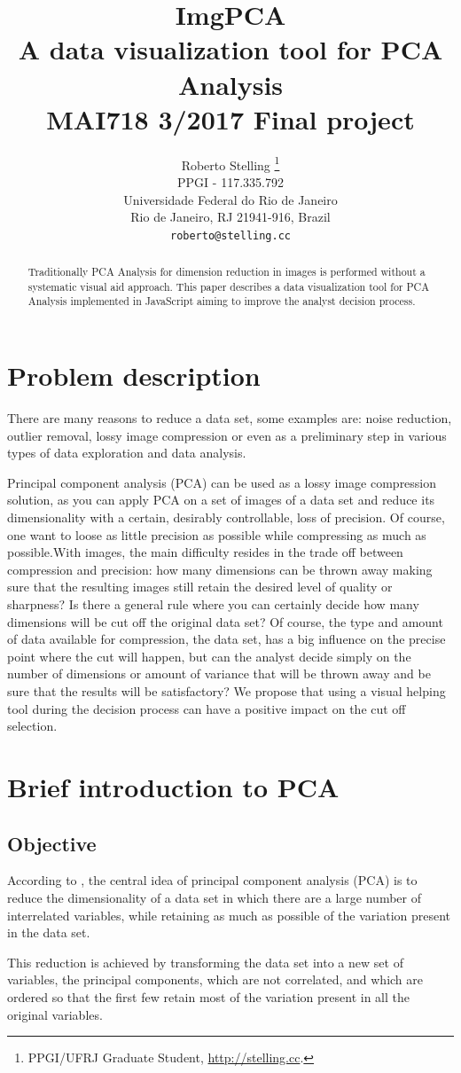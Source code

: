 \documentclass{article} %
\title{ImgPCA \\ A data visualization tool for PCA Analysis \\ MAI718 3/2017 Final project}
\author{Roberto Stelling \thanks{ PPGI/UFRJ Graduate Student, \href{http://stelling.cc}{http://stelling.cc}.} \\
PPGI - 117.335.792\\
Universidade Federal do Rio de Janeiro\\
Rio de Janeiro, RJ 21941-916, Brazil \\
\texttt{roberto@stelling.cc}
}
\begin{document}
\maketitle
\pagestyle{plain}

\begin{abstract}
Traditionally PCA Analysis for dimension reduction in images is performed without a systematic visual aid approach. This paper describes a data visualization tool for PCA Analysis implemented in JavaScript aiming to improve the analyst decision process.
\end{abstract}

\section{Problem description}
There are many reasons to reduce a data set, some examples are: noise reduction, outlier removal, lossy image compression or even as a preliminary step in various types of data exploration and data analysis.\par
Principal component analysis (PCA) can be used as a lossy image compression solution, as you can apply PCA on a set of images of a data set and reduce its dimensionality with a certain, desirably controllable, loss of precision. Of course, one want to loose as little precision as possible while compressing as much as possible.With images, the main difficulty resides in the trade off between compression and precision: how many dimensions can be thrown away making sure that the resulting images still retain the desired level of quality or sharpness? Is there a general rule where you can certainly decide how many dimensions will be cut off the original data set? Of course, the type and amount of data available for compression, the data set, has a big influence on the precise point where the cut will happen, but can the analyst decide simply on the number of dimensions or amount of variance that will be thrown away and be sure that the results will be satisfactory? We propose that using a visual helping tool during the decision process can have a positive impact on the cut off selection.

\section{Brief introduction to PCA}
\subsection{Objective}
According to \citet{jolliffe1986principal}, the central idea of principal component analysis (PCA) is to reduce the dimensionality of a data set in which there are a large number of interrelated variables, while retaining as much as possible of the variation present in the data set.\par
This reduction is achieved by transforming the data set into a new set of variables, the principal components, which are not correlated, and which are ordered so that the first few retain most of the variation present in all the original variables.\par
\end{document}
